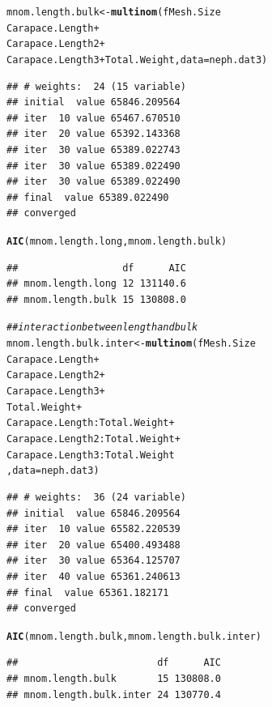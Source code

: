 \documentclass[12pt]{article}\usepackage[]{graphicx}\usepackage[]{color}
\makeatletter
\newcommand{\hlcom}[1]{\textcolor[rgb]{0.678,0.584,0.686}{\textit{#1}}}%
\newcommand{\hlopt}[1]{\textcolor[rgb]{0,0,0}{#1}}%
\newcommand{\hlstd}[1]{\textcolor[rgb]{0.345,0.345,0.345}{#1}}%
\newcommand{\hlkwb}[1]{\textcolor[rgb]{0.69,0.353,0.396}{#1}}%
\newcommand{\hlkwc}[1]{\textcolor[rgb]{0.333,0.667,0.333}{#1}}%
\newcommand{\hlkwd}[1]{\textcolor[rgb]{0.737,0.353,0.396}{\textbf{#1}}}%
\newenvironment{kframe}{%
 \def\at@end@of@kframe{}%
 \ifinner\ifhmode%
  \def\at@end@of@kframe{\end{minipage}}%
  \begin{minipage}{\columnwidth}%
 \fi\fi%
 \def\FrameCommand##1{\hskip\@totalleftmargin \hskip-\fboxsep
 \colorbox{shadecolor}{##1}\hskip-\fboxsep
     \hskip-\linewidth \hskip-\@totalleftmargin \hskip\columnwidth}%
 \MakeFramed {\advance\hsize-\width
   \@totalleftmargin\z@ \linewidth\hsize
   \@setminipage}}%
 {\par\unskip\endMakeFramed%
 \at@end@of@kframe}
\newenvironment{knitrout}{}{} %
\makeatother
\begin{document}
\begin{knitrout}
\begin{kframe}
\begin{alltt}
\hlstd{mnom.length.bulk} \hlkwb{<-} \hlkwd{multinom}\hlstd{(fMesh.Size} \hlopt{~}
                             \hlstd{Carapace.Length} \hlopt{+}
                             \hlstd{Carapace.Length2} \hlopt{+}
                             \hlstd{Carapace.Length3} \hlopt{+} \hlstd{Total.Weight,} \hlkwc{data} \hlstd{= neph.dat3)}
\end{alltt}
\begin{verbatim}
## # weights:  24 (15 variable)
## initial  value 65846.209564 
## iter  10 value 65467.670510
## iter  20 value 65392.143368
## iter  30 value 65389.022743
## iter  30 value 65389.022490
## iter  30 value 65389.022490
## final  value 65389.022490 
## converged
\end{verbatim}
\begin{alltt}
\hlkwd{AIC}\hlstd{(mnom.length.long, mnom.length.bulk)}
\end{alltt}
\begin{verbatim}
##                  df      AIC
## mnom.length.long 12 131140.6
## mnom.length.bulk 15 130808.0
\end{verbatim}
\begin{alltt}
\hlcom{## interaction between length and bulk}
\hlstd{mnom.length.bulk.inter} \hlkwb{<-} \hlkwd{multinom}\hlstd{(fMesh.Size} \hlopt{~}
                                   \hlstd{Carapace.Length} \hlopt{+}
                                   \hlstd{Carapace.Length2} \hlopt{+}
                                   \hlstd{Carapace.Length3} \hlopt{+}
                                   \hlstd{Total.Weight} \hlopt{+}
                                   \hlstd{Carapace.Length}\hlopt{:}\hlstd{Total.Weight} \hlopt{+}
                                   \hlstd{Carapace.Length2}\hlopt{:}\hlstd{Total.Weight} \hlopt{+}
                                   \hlstd{Carapace.Length3}\hlopt{:}\hlstd{Total.Weight}
                                   \hlstd{,} \hlkwc{data} \hlstd{= neph.dat3)}
\end{alltt}
\begin{verbatim}
## # weights:  36 (24 variable)
## initial  value 65846.209564 
## iter  10 value 65582.220539
## iter  20 value 65400.493488
## iter  30 value 65364.125707
## iter  40 value 65361.240613
## final  value 65361.182171 
## converged
\end{verbatim}
\begin{alltt}
\hlkwd{AIC}\hlstd{(mnom.length.bulk, mnom.length.bulk.inter)}
\end{alltt}
\begin{verbatim}
##                        df      AIC
## mnom.length.bulk       15 130808.0
## mnom.length.bulk.inter 24 130770.4
\end{verbatim}
\end{kframe}
\end{knitrout}
\end{document}
